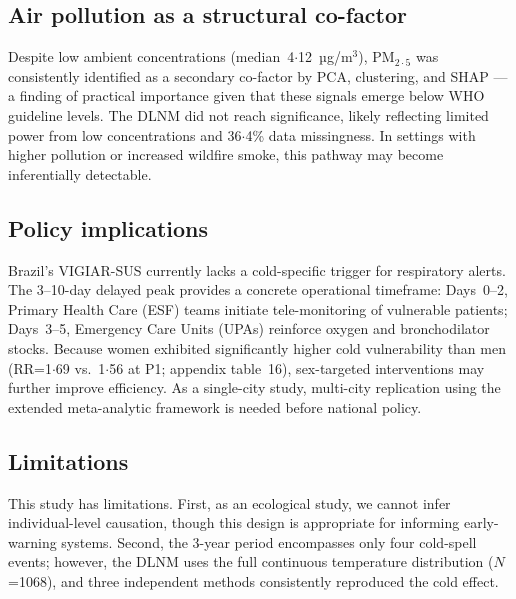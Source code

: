 \documentclass[review,number]{elsarticle}
\begin{document}
\subsection{Air pollution as a structural co-factor}

Despite low ambient concentrations (median~4${\cdot}$12~µg/m$^3$),
$\text{PM}_{2{\cdot}5}$ was consistently identified as a secondary co-factor
by PCA, clustering, and SHAP --- a finding of practical importance given that these signals
emerge below WHO guideline levels.\cite{Cheng2024} The DLNM
did not reach significance, likely reflecting limited power from low
concentrations and 36${\cdot}$4\% data missingness. In settings with
higher pollution or increased wildfire smoke, this pathway may become
inferentially detectable.

\subsection{Policy implications}

Brazil's VIGIAR-SUS currently lacks a cold-specific trigger for
respiratory alerts.\cite{Bell2024} The 3--10-day delayed peak
provides a concrete operational timeframe: Days~0--2, Primary Health
Care (ESF) teams initiate tele-monitoring of vulnerable patients;
Days~3--5, Emergency Care Units (UPAs) reinforce oxygen and
bronchodilator stocks. Because women exhibited significantly higher
cold vulnerability than men (RR=1${\cdot}$69 vs.\ 1${\cdot}$56 at P1;
appendix table~16), sex-targeted interventions may further improve
efficiency. As a single-city study, multi-city replication using the
extended
meta-analytic
framework\cite{Sera2019,Gasparrini2015} is needed before national
policy.\cite{Requia2024}

\subsection{Limitations}

This study has limitations. First, as an ecological
study, we cannot infer individual-level causation, though this design
is appropriate for informing early-warning systems. Second, the
3-year period encompasses only four cold-spell events; however, the
DLNM uses the full continuous temperature distribution ($N$=1068),
and three independent methods consistently reproduced the cold effect.
\end{document}
